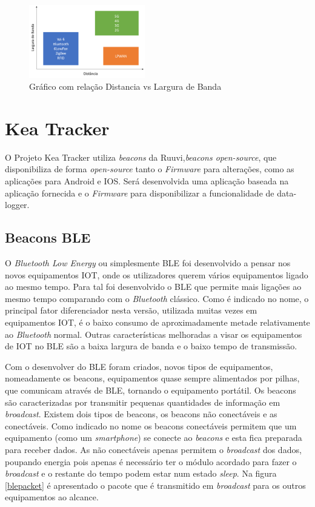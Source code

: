 \begin{figure}[ht]
\centering
\includegraphics[width=0.45\textwidth]{images/lpwan.png}
\caption{Gráfico com relação Distancia vs Largura de Banda\cite{masterthesisLPWAN}}\label{figgraphlpwan}
\end{figure}



\section {Kea Tracker}\label{kea}
O Projeto Kea Tracker utiliza \textit{beacons} da Ruuvi,\textit{beacons open-source}\cite{ruuvi}, que disponibiliza de forma \textit{open-source} tanto o \textit{Firmware} para alterações, como as aplicações para Android e IOS. Será desenvolvida uma aplicação baseada na aplicação fornecida e o \textit{Firmware} para disponibilizar a funcionalidade de data-logger.
\subsection{Beacons BLE}
\par
O \textit{Bluetooth Low Energy} ou simplesmente BLE foi desenvolvido a pensar nos novos equipamentos IOT, onde os utilizadores querem vários equipamentos ligado ao mesmo tempo. Para tal foi desenvolvido o BLE que permite mais ligações ao mesmo tempo comparando com o \textit{Bluetooth} clássico.
Como é indicado no nome, o principal fator diferenciador nesta versão, utilizada muitas vezes em equipamentos IOT, é o baixo consumo de aproximadamente metade relativamente ao \textit{Bluetooth} normal. Outras características melhoradas a visar os equipamentos de IOT no BLE são a baixa largura de banda e o baixo tempo de transmissão.

Com o desenvolver do BLE foram criados, novos tipos de equipamentos, nomeadamente os beacons, equipamentos quase sempre alimentados por pilhas, que comunicam através de BLE, tornando o equipamento portátil. Os beacons são caracterizadas por transmitir pequenas quantidades de informação em \textit{broadcast}.
Existem dois tipos de beacons, os beacons não conectáveis e as conectáveis\cite{blepacket}. Como indicado no nome os beacons conectáveis permitem que um equipamento (como um \textit{smartphone}) se conecte ao \textit{beacons} e esta fica preparada para receber dados. As não conectáveis apenas permitem o \textit{broadcast}  dos dados, poupando energia pois apenas é necessário ter o módulo acordado para fazer o \textit{broadcast} e o restante do tempo podem estar num estado \textit{sleep}. Na figura \ref{blepacket} é apresentado o pacote que é transmitido em \textit{broadcast} para os outros equipamentos ao alcance.

